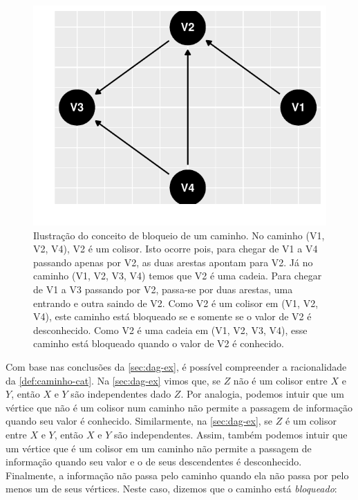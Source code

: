 \begin{knitrout}
\color{fgcolor}\begin{figure}[t]

{\centering \includegraphics[width=\maxwidth]{./figures/caminho-cat-1} 

}

\caption[Ilustração do conceito de bloqueio de um caminho]{Ilustração do conceito de bloqueio de um caminho. No caminho (V1, V2, V4), V2 é um colisor. Isto ocorre pois, para chegar de V1 a V4 passando apenas por V2, as duas arestas apontam para V2. Já no caminho (V1, V2, V3, V4) temos que V2 é uma cadeia. Para chegar de V1 a V3 passando por V2, passa-se por duas arestas, uma entrando e outra saindo de V2. Como V2 é um colisor em (V1, V2, V4), este caminho está bloqueado se e somente se o valor de V2 é desconhecido. Como V2 é uma cadeia em (V1, V2, V3, V4), esse caminho está bloqueado quando o valor de V2 é conhecido.}\label{fig:caminho-cat}
\end{figure}

\end{knitrout}

Com base nas conclusões da \cref{sec:dag-ex},
é possível compreender a racionalidade
da \cref{def:caminho-cat}.
Na \cref{sec:dag-ex} vimos que,
se $Z$ não é um colisor entre
$X$ e $Y$, então
$X$ e $Y$ são independentes dado $Z$.
Por analogia, podemos intuir que um vértice que
não é um colisor num caminho
não permite a passagem de informação
quando seu valor é conhecido.
Similarmente, na \cref{sec:dag-ex},
se $Z$ é um colisor entre
$X$ e $Y$, então 
$X$ e $Y$ são independentes.
Assim, também podemos intuir que um vértice que
é um colisor em um caminho não permite
a passagem de informação quando seu valor e
o de seus descendentes é desconhecido.
Finalmente, a informação não passa pelo caminho quando
ela não passa por pelo menos um de seus vértices.
Neste caso, dizemos que o caminho está \textit{bloqueado}:

